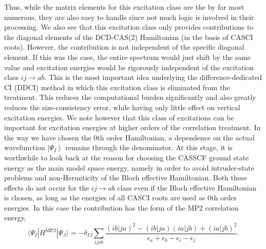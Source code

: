 Thus, while the matrix elements for this excitation class are the by far most numerous, they are also easy to handle since not much logic is involved in their processing. We also see that this excitation class only provides contributions to the diagonal elements of the DCD-CAS(2) Hamiltonian (in the basis of CASCI roots). However, the contribution is not independent of the specific diagonal element. If this was the case, the entire spectrum would just shift by the same value and excitation energies would be rigorously independent of the excitation class $ij\rightarrow ab$. This is the most important idea underlying the difference-dedicated CI (DDCI) method\cite{MiralCCM_1993_33, GarciCCM_1995_222} in which this excitation class is eliminated from the treatment. This reduces the computational burden significantly and also greatly reduces the size-consistency error, while having only little effect on vertical excitation energies. We note however that this class of excitations can be important for excitation energies at higher orders of the correlation treatment. In the way we have chosen the 0th order Hamiltonian, a dependence on the actual wavefunction $\left| {{\Psi _I}} \right\rangle$ remains through the denominator.
At this stage, it is worthwhile to look back at the reason for choosing the CASSCF ground state energy as the main model space energy, namely in order to avoid intruder-state problems and non-Hermiticity of the Bloch effective Hamiltonian. Both these effects do not occur for the $ij\rightarrow ab$ class even if the Bloch effective Hamiltonian is chosen, as long as the energies of all CASCI roots are used as 0th order energies. In this case the contribution has the form of the MP2 correlation energy,
\begin{equation}
\label{Eq:ijab_MP2}
\langle \Psi_I | H^\text{MP2} | \Psi_J\rangle = - \delta_{IJ} \sum_{ijab} \frac{{(ib|ja)^2} - (ib|ja)(ia|jb) + {(ia|jb)^2}}{\epsilon_a + \epsilon_b - \epsilon_i - \epsilon_j}.
\end{equation}
